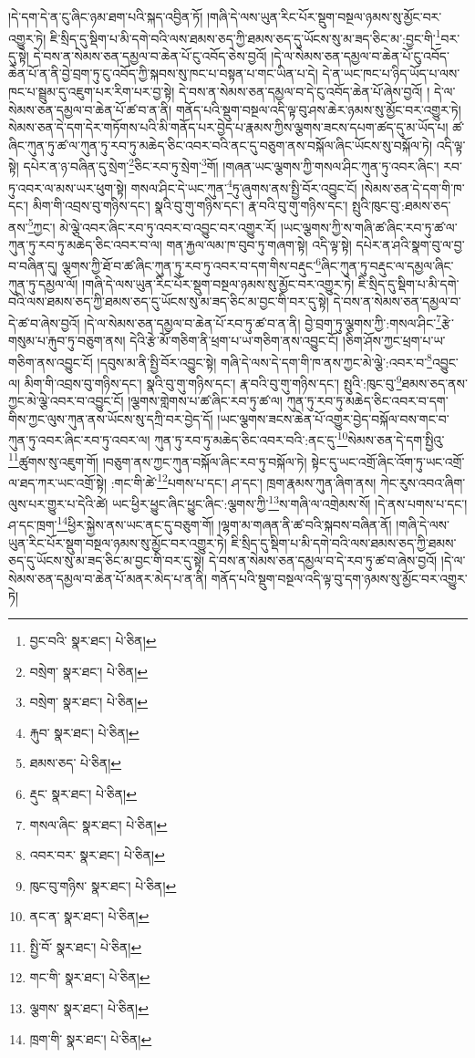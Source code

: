 །དེ་དག་དེ་ན་ངུ་ཞིང་ཉམ་ཐག་པའི་སྐད་འབྱིན་ཏོ། །གཞི་དེ་ལས་ཡུན་རིང་པོར་སྡུག་བསྔལ་ཉམས་སུ་མྱོང་བར་འགྱུར་ཏེ། ཇི་སྲིད་དུ་སྡིག་པ་མི་དགེ་བའི་ལས་ཐམས་ཅད་ཀྱི་ཐམས་ཅད་དུ་ཡོངས་སུ་མ་ཟད་ཅིང་མ་:བྱང་གི་\footnote{བྱང་བའི་  སྣར་ཐང་།  པེ་ཅིན། }བར་དུ་སྟེ། དེ་བས་ན་སེམས་ཅན་དམྱལ་བ་ཆེན་པོ་ངུ་འབོད་ཅེས་བྱའོ། །དེ་ལ་སེམས་ཅན་དམྱལ་བ་ཆེན་པོ་ངུ་འབོད་ཆེན་པོ་ན་ནི་བྱེ་བྲག་ཏུ་ངུ་འབོད་ཀྱི་སྐབས་སུ་ཁང་པ་བསྟན་པ་གང་ཡིན་པ་དེ། དེ་ན་ཡང་ཁང་པ་ཉིད་ཡོད་པ་ལས་ཁང་པ་སྦྲུམ་དུ་འཇུག་པར་རིག་པར་བྱ་སྟེ། དེ་བས་ན་སེམས་ཅན་དམྱལ་བ་དེ་ངུ་འབོད་ཆེན་པོ་ཞེས་བྱའོ། །
དེ་ལ་སེམས་ཅན་དམྱལ་བ་ཆེན་པོ་ཚ་བ་ན་ནི། གནོད་པའི་སྡུག་བསྔལ་འདི་ལྟ་བུ་ཤས་ཆེར་ཉམས་སུ་མྱོང་བར་འགྱུར་ཏེ། སེམས་ཅན་དེ་དག་དེར་གཏོགས་པའི་མི་གནོད་པར་བྱེད་པ་རྣམས་ཀྱིས་ལྕགས་ཟངས་དཔག་ཚད་དུ་མ་ཡོད་པ། ཚ་ཞིང་ཀུན་ཏུ་ཚ་ལ་ཀུན་ཏུ་རབ་ཏུ་མཆེད་ཅིང་འབར་བའི་ནང་དུ་བཅུག་ནས་བསྐོལ་ཞིང་ཡོངས་སུ་བསྐོལ་ཏེ། འདི་ལྟ་སྟེ། དཔེར་ན་ཉ་བཞིན་དུ་སྲེག་\footnote{བསྲེག་  སྣར་ཐང་།  པེ་ཅིན། }ཅིང་རབ་ཏུ་སྲེག་\footnote{བསྲེག་  སྣར་ཐང་།  པེ་ཅིན། }གོ། །གཞན་ཡང་ལྕགས་ཀྱི་གསལ་ཤིང་ཀུན་ཏུ་འབར་ཞིང་། རབ་ཏུ་འབར་ལ་མས་ཡར་ཕུག་སྟེ། གསལ་ཤིང་དེ་ཡང་ཀུན་\footnote{རྐུབ་  སྣར་ཐང་།  པེ་ཅིན། }ཏུ་ཞུགས་ནས་སྤྱི་བོར་འབྱུང་ངོ། །སེམས་ཅན་དེ་དག་གི་ཁ་དང་། མིག་གི་འབྲས་བུ་གཉིས་དང་། སྣའི་བུ་གུ་གཉིས་དང་། རྣ་བའི་བུ་གུ་གཉིས་དང་། སྤུའི་ཁུང་བུ་:ཐམས་ཅད་ནས་\footnote{ཐམས་ཅད་  པེ་ཅིན། }ཀྱང་། མེ་ལྕེ་འབར་ཞིང་རབ་ཏུ་འབར་བ་འབྱུང་བར་འགྱུར་རོ། །ཡང་ལྕགས་ཀྱི་ས་གཞི་ཚ་ཞིང་རབ་ཏུ་ཚ་ལ་ཀུན་ཏུ་རབ་ཏུ་མཆེད་ཅིང་འབར་བ་ལ། གན་རྐྱལ་ལམ་ཁ་བུབ་ཏུ་གཞག་སྟེ། འདི་ལྟ་སྟེ། དཔེར་ན་ཤའི་སྣག་བུ་ལ་བྱ་བ་བཞིན་དུ། ལྕགས་ཀྱི་ཐོ་བ་ཚ་ཞིང་ཀུན་ཏུ་རབ་ཏུ་འབར་བ་དག་གིས་བརྡུང་\footnote{རྡུང་  སྣར་ཐང་།  པེ་ཅིན། }ཞིང་ཀུན་ཏུ་བརྡུང་ལ་དམྱལ་ཞིང་ཀུན་ཏུ་དམྱལ་ལོ། །གཞི་དེ་ལས་ཡུན་རིང་པོར་སྡུག་བསྔལ་ཉམས་སུ་མྱོང་བར་འགྱུར་ཏེ། ཇི་སྲིད་དུ་སྡིག་པ་མི་དགེ་བའི་ལས་ཐམས་ཅད་ཀྱི་ཐམས་ཅད་དུ་ཡོངས་སུ་མ་ཟད་ཅིང་མ་བྱང་གི་བར་དུ་སྟེ། དེ་བས་ན་སེམས་ཅན་དམྱལ་བ་དེ་ཚ་བ་ཞེས་བྱའོ། །དེ་ལ་སེམས་ཅན་དམྱལ་བ་ཆེན་པོ་རབ་ཏུ་ཚ་བ་ན་ནི། བྱེ་བྲག་ཏུ་ལྕགས་ཀྱི་:གསལ་ཤིང་\footnote{གསལ་ཞིང་  སྣར་ཐང་།  པེ་ཅིན། }རྩེ་གསུམ་པ་རྐུབ་ཏུ་བཅུག་ནས། དེའི་རྩེ་མོ་གཅིག་ནི་ཕྲག་པ་ཡ་གཅིག་ནས་འབྱུང་ངོ། །ཅིག་ཤོས་ཀྱང་ཕྲག་པ་ཡ་གཅིག་ནས་འབྱུང་ངོ། །དབུས་མ་ནི་སྤྱི་བོར་འབྱུང་སྟེ། གཞི་དེ་ལས་དེ་དག་གི་ཁ་ནས་ཀྱང་མེ་ལྕེ་:འབར་བ་\footnote{འབར་བར་  སྣར་ཐང་།  པེ་ཅིན། }འབྱུང་ལ། མིག་གི་འབྲས་བུ་གཉིས་དང་། སྣའི་བུ་གུ་གཉིས་དང་། རྣ་བའི་བུ་གུ་གཉིས་དང་། སྤུའི་:ཁུང་བུ་\footnote{ཁུང་བུ་གཉིས་  སྣར་ཐང་།  པེ་ཅིན། }ཐམས་ཅད་ནས་ཀྱང་མེ་ལྕེ་འབར་བ་འབྱུང་ངོ། །ལྕགས་གླེགས་པ་ཚ་ཞིང་རབ་ཏུ་ཚ་ལ། ཀུན་ཏུ་རབ་ཏུ་མཆེད་ཅིང་འབར་བ་དག་གིས་ཀྱང་ལུས་ཀུན་ནས་ཡོངས་སུ་དཀྲི་བར་བྱེད་དོ། །ཡང་ལྕགས་ཟངས་ཆེན་པོ་འགྱུར་བྱེད་བསྐོལ་བས་གང་བ་ཀུན་ཏུ་འབར་ཞིང་རབ་ཏུ་འབར་ལ། ཀུན་ཏུ་རབ་ཏུ་མཆེད་ཅིང་འབར་བའི་:ནང་དུ་\footnote{ནང་ན་  སྣར་ཐང་།  པེ་ཅིན། }སེམས་ཅན་དེ་དག་སྤྱིའུ་\footnote{སྤྱི་བོ་  སྣར་ཐང་།  པེ་ཅིན། }ཚུགས་སུ་འཇུག་གོ། །བཅུག་ནས་ཀྱང་ཀུན་བསྐོལ་ཞིང་རབ་ཏུ་བསྐོལ་ཏེ། སྟེང་དུ་ཡང་འགྲོ་ཞིང་འོག་ཏུ་ཡང་འགྲོ་ལ་ཐད་ཀར་ཡང་འགྲོ་སྟེ། :གང་གི་ཚེ་\footnote{གང་གི་  སྣར་ཐང་།  པེ་ཅིན། }པགས་པ་དང་། ཤ་དང་། ཁྲག་རྣམས་ཀུན་ཞིག་ནས། ཀེང་རུས་འབའ་ཞིག་ལུས་པར་གྱུར་པ་དེའི་ཚེ། ཡང་ཕྱིར་ཕྱུང་ཞིང་ཕྱུང་ཞིང་:ལྕགས་ཀྱི་\footnote{ལྕགས་  སྣར་ཐང་།  པེ་ཅིན། }ས་གཞི་ལ་འགྲེམས་སོ། །དེ་ནས་པགས་པ་དང་། ཤ་དང་ཁྲག་\footnote{ཁྲག་གི་  སྣར་ཐང་།  པེ་ཅིན། }ཕྱིར་སྐྱེས་ནས་ཡང་ནང་དུ་བཅུག་གོ། །ལྷག་མ་གཞན་ནི་ཚ་བའི་སྐབས་བཞིན་ནོ། །གཞི་དེ་ལས་ཡུན་རིང་པོར་སྡུག་བསྔལ་ཉམས་སུ་མྱོང་བར་འགྱུར་ཏེ། ཇི་སྲིད་དུ་སྡིག་པ་མི་དགེ་བའི་ལས་ཐམས་ཅད་ཀྱི་ཐམས་ཅད་དུ་ཡོངས་སུ་མ་ཟད་ཅིང་མ་བྱང་གི་བར་དུ་སྟེ། དེ་བས་ན་སེམས་ཅན་དམྱལ་བ་དེ་རབ་ཏུ་ཚ་བ་ཞེས་བྱའོ། །དེ་ལ་སེམས་ཅན་དམྱལ་བ་ཆེན་པོ་མནར་མེད་པ་ན་ནི། གནོད་པའི་སྡུག་བསྔལ་འདི་ལྟ་བུ་དག་ཉམས་སུ་མྱོང་བར་འགྱུར་ཏེ། 
